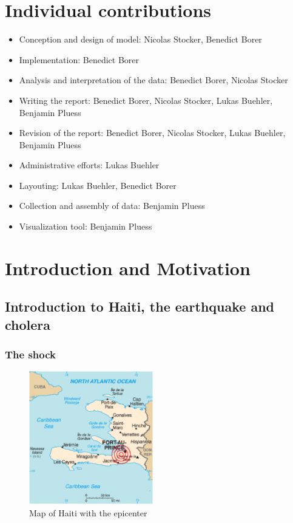 \documentclass[11pt]{article}
\begin{document}
\section{Individual contributions}
\begin{itemize}
\item Conception and design of model: Nicolas Stocker, Benedict Borer
\item Implementation: Benedict Borer
\item Analysis and interpretation of the data: Benedict Borer, Nicolas Stocker
\item Writing the report: Benedict Borer, Nicolas Stocker, Lukas Buehler, Benjamin Pluess
\item Revision of the report: Benedict Borer, Nicolas Stocker, Lukas Buehler, Benjamin Pluess
\item Administrative efforts: Lukas Buehler
\item Layouting: Lukas Buehler, Benedict Borer
\item Collection and assembly of data: Benjamin Pluess
\item Visualization tool: Benjamin Pluess
\end{itemize}


\newpage
\section{Introduction and Motivation}
\subsection{Introduction to Haiti, the earthquake and cholera }
\subsubsection*{The shock}


\begin{figure}
\includegraphics[width=0.48\textwidth]{Bilder/KarteHaiti.png}
\caption{Map of Haiti with the epicenter \cite{wikipedia:map}}
\label{pic:map_haiti}
\end{figure}
\end{document}
